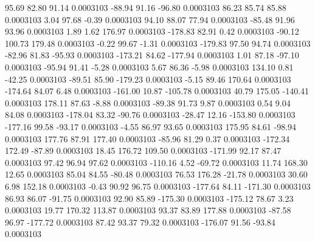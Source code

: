        95.69       82.80       91.14     0.0003103
      -88.94       91.16      -96.80     0.0003103
       86.23       85.74       85.88     0.0003103
        3.04       97.68       -0.39     0.0003103
       94.10       88.07       77.94     0.0003103
      -85.48       91.96       93.96     0.0003103
        1.89        1.62      176.97     0.0003103
     -178.83       82.91        0.42     0.0003103
      -90.12      100.73      179.48     0.0003103
       -0.22       99.67       -1.31     0.0003103
     -179.83       97.50       94.74     0.0003103
      -82.96       81.83      -95.93     0.0003103
     -173.21       84.62     -177.94     0.0003103
        1.01       87.18      -97.10     0.0003103
      -95.94       91.41       -5.28     0.0003103
        5.67       86.36       -5.98     0.0003103
      134.10        0.81      -42.25     0.0003103
      -89.51       85.90     -179.23     0.0003103
       -5.15       89.46      170.64     0.0003103
     -174.64       84.07        6.48     0.0003103
     -161.00       10.87     -105.78     0.0003103
       40.79      175.05     -140.41     0.0003103
      178.11       87.63       -8.88     0.0003103
      -89.38       91.73        9.87     0.0003103
        0.54        9.04       84.08     0.0003103
     -178.04       83.32      -90.76     0.0003103
      -28.47       12.16     -153.80     0.0003103
     -177.16       99.58      -93.17     0.0003103
       -4.55       86.97       93.65     0.0003103
      175.95       84.61      -98.94     0.0003103
      177.76       87.91      177.40     0.0003103
      -85.96       81.29        0.37     0.0003103
     -172.34      172.49      -87.89     0.0003103
       18.45      176.72      109.50     0.0003103
     -171.99       92.17       87.47     0.0003103
       97.42       96.94       97.62     0.0003103
     -110.16        4.52      -69.72     0.0003103
       11.74      168.30       12.65     0.0003103
       85.04       84.55      -80.48     0.0003103
       76.53      176.28      -21.78     0.0003103
       30.60        6.98      152.18     0.0003103
       -0.43       90.92       96.75     0.0003103
     -177.64       84.11     -171.30     0.0003103
       86.93       86.07      -91.75     0.0003103
       92.90       85.89     -175.30     0.0003103
     -175.12       78.67        3.23     0.0003103
       19.77      170.32      113.87     0.0003103
       93.37       83.89      177.88     0.0003103
      -87.58       96.97     -177.72     0.0003103
       87.42       93.37       79.32     0.0003103
     -176.07       91.56      -93.84     0.0003103
